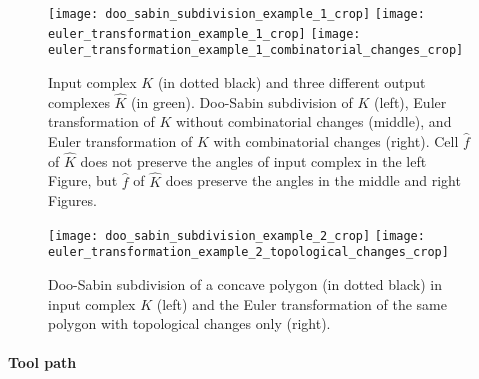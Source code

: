 \begin{figure}[ht!] 
	\centering
	\texttt{[image: doo\_sabin\_subdivision\_example\_1\_crop]}
	\quad
	\texttt{[image: euler\_transformation\_example\_1\_crop]}
	\quad
	\texttt{[image: euler\_transformation\_example\_1\_combinatorial\_changes\_crop]}
	\caption{\label{fig:exampdooeulercombinat}
        Input complex $K$ (in dotted black) and three different output complexes $\hat{K}$ (in green).
        Doo-Sabin subdivision of $K$ (left), Euler transformation of $K$ without combinatorial changes (middle), and Euler transformation of $K$ with combinatorial changes (right).
        Cell $\hat{f}$ of $\hat{K}$ does not preserve the angles of input complex in the left Figure, but $\hat{f}$ of $\hat{K}$ does preserve the angles in the middle and right Figures. }
\end{figure}

\begin{figure}[ht!] 
	\centering
	\texttt{[image: doo\_sabin\_subdivision\_example\_2\_crop]}
	\quad
	\quad
	\texttt{[image: euler\_transformation\_example\_2\_topological\_changes\_crop]}
	\caption{\label{fig:exampdooeulertopochang} Doo-Sabin subdivision of a concave polygon (in dotted black) in input complex $K$ (left) and the Euler transformation of the same polygon with topological changes only (right).
        }
\end{figure}




\paragraph{Tool path}\label{sssec:toolpath}


